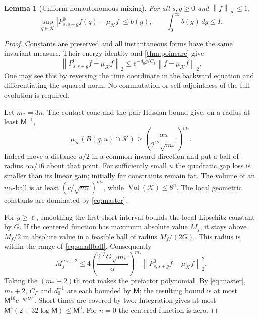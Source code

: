 \documentclass[11pt]{article}
\numberwithin{equation}{section}
\newtheorem{lemma}[theorem]{Lemma}
\theoremstyle{definition}
\theoremstyle{remark}\newtheorem{remark}[theorem]{Remark}
\newcommand{\Vol}{\operatorname{Vol}}
\newcommand{\K}{\mathcal K}
\newcommand{\dd}{\,d}
\newcommand{\norm}[1]{\left\|#1\right\|}
\begin{document}
\begin{lemma}[Uniform nonautonomous mixing]\label{lem:mixing}
For all $s,g\ge0$ and $\norm f_\infty\le1$,
\begin{equation}\label{eq:mixing}
 \sup_{q\in\K}|P^0_{s,s+g}f(q)-\mu_\K f|\le b(g),
 \qquad \int_0^\infty b(g)\dd g\le I.
\end{equation}
\end{lemma}
\begin{proof}
Constants are preserved and all instantaneous forms have the same invariant
measure. Their energy identity and \cref{thm:poincare} give
\begin{equation}\label{eq:L2}
 \norm{P^0_{s,s+g}f-\mu_\K f}_2
 \le e^{-d_0g/C_P}\norm{f-\mu_\K f}_2.
\end{equation}
One may see this by reversing the time coordinate in the backward equation
and differentiating the squared norm. No commutation or self-adjointness of
the full evolution is required.

Let $m_*=3n$. The contact cone and the pair Hessian bound give, on a radius
at least $\mathsf M^{-1}$,
\begin{equation}\label{eq:smallball}
 \mu_\K(B(q,u)\cap\K)
 \ge\left(\frac{\alpha u}{2^{12}\sqrt{m_*}}\right)^{m_*}.
\end{equation}
Indeed move a distance $u/2$ in a common inward direction and put a ball
of radius $\alpha u/16$ about that point. For sufficiently small $u$ the
quadratic gap loss is smaller than its linear gain; initially far
constraints remain far. The volume of an $m_*$-ball is at least
$(c/\sqrt{m_*})^{m_*}$, while $\Vol(\K)\le8^n$. The local geometric
constants are dominated by \eqref{eq:master}.

For $g\ge\ell$, smoothing the first short interval bounds the local
Lipschitz constant by $G$. If the centered function has maximum absolute
value $M_f$, it stays above $M_f/2$ in absolute value in a feasible ball
of radius $M_f/(2G)$. This radius is within the range of
\eqref{eq:smallball}. Consequently
\[
 M_f^{m_*+2}\le
 4\left(\frac{2^{13}G\sqrt{m_*}}\alpha\right)^{m_*}
 \norm{P^0_{s,s+g}f-\mu_\K f}_2^2.
\]
Taking the $(m_*+2)$th root makes the prefactor polynomial. By
\eqref{eq:master}, $m_*+2$, $C_P$ and $d_0^{-1}$ are each bounded by
$\mathsf M$; the resulting bound is at most
$\mathsf M^{16}e^{-g/\mathsf M^4}$. Short times are covered by two.
Integration gives at most
$\mathsf M^4(2+32\log\mathsf M)\le\mathsf M^6$.
For $n=0$ the centered function is zero.
\end{proof}
\end{document}
